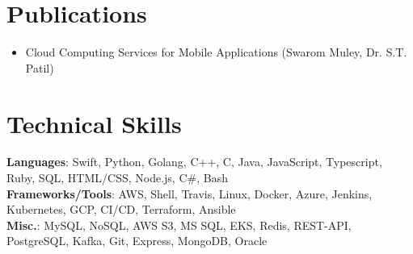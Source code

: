 \documentclass[letterpaper,11pt]{article}
\newcommand{\resumeItem}[1]{
  \item\small{
    {#1 \vspace{-2pt}}
  }
}
\newcommand{\resumeItemListStart}{\begin{itemize}}
\newcommand{\resumeItemListEnd}{\end{itemize}\vspace{-5pt}}
\begin{document}
\section{Publications}
    \resumeItemListStart
    \resumeItem{Cloud Computing Services for Mobile Applications (Swarom Muley, Dr. S.T. Patil)}
    \resumeItemListEnd
  \vspace{-13pt}






\section{Technical Skills}
 \begin{itemize}[leftmargin=0.15in, label={}]
    \small{\item{
     \textbf{Languages}{: Swift, Python, Golang, C++, C, Java, JavaScript, Typescript, Ruby, SQL, HTML/CSS, Node.js, C\#, Bash} \\
     \textbf{Frameworks/Tools}{: AWS, Shell, Travis, Linux, Docker, Azure, Jenkins, Kubernetes, GCP, CI/CD, Terraform, Ansible} \\
     \textbf{Misc.}{: MySQL, NoSQL, AWS S3, MS SQL, EKS, Redis, REST-API, PostgreSQL, Kafka, Git, Express, MongoDB, Oracle} \\
    }}
 \end{itemize}
 \vspace{-16pt}
\end{document}
